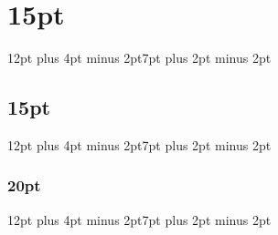 
\usepackage{amsmath,amssymb}
\usepackage[tracking]{microtype}

\usepackage[sc,osf]{mathpazo}
\linespread{1.025}              
\usepackage[euler-digits,small]{eulervm}

\usepackage[T1]{fontenc}
\usepackage[utf8]{inputenc}
\usepackage[square,sort,comma]{natbib} 

\usepackage[french]{babel}
\usepackage{cancel}
\usepackage{multirow}
\usepackage{supertabular}
\usepackage{algorithmic}
\usepackage{algorithm}
\usepackage{amsthm}
\usepackage{float}
\usepackage{tabularx}
\usepackage[justification=centering]{caption}
\usepackage{longtable}
\usepackage{titlesec}
\usepackage{setspace}
\usepackage{booktabs}
\usepackage{pdfpages}
\usepackage{titlesec}

\titlespacing\section{15pt}{12pt plus 4pt minus 2pt}{7pt plus 2pt minus 2pt}
\titlespacing\subsection{15pt}{12pt plus 4pt minus 2pt}{7pt plus 2pt minus 2pt}
\titlespacing\subsubsection{20pt}{12pt plus 4pt minus 2pt}{7pt plus 2pt minus 2pt}
\setlength{\parindent}{20pt}
\usepackage{geometry}
\geometry{hmargin=2.5cm,vmargin=2.5cm}

\usepackage{silence}


\usepackage{aecompl}
\usepackage{url}

\usepackage[withpage]{acronym}

